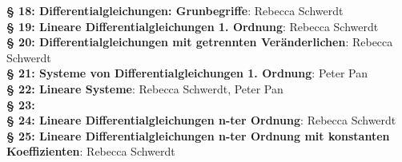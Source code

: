\documentclass[a4paper,twoside,DIV15,BCOR12mm,chapterprefix=true,headings=twolinechapter]{scrbook}
\begin{document}
\textbf{§ 18: Differentialgleichungen: Grunbegriffe}: Rebecca Schwerdt\\
\textbf{§ 19: Lineare Differentialgleichungen 1. Ordnung}: Rebecca Schwerdt\\
\textbf{§ 20: Differentialgleichungen mit getrennten Veränderlichen}: Rebecca Schwerdt\\
\textbf{§ 21: Systeme von Differentialgleichungen 1. Ordnung}: Peter Pan\\
\textbf{§ 22: Lineare Systeme}: Rebecca Schwerdt, Peter Pan\\
\textbf{§ 23: }\\
\textbf{§ 24: Lineare Differentialgleichungen n-ter Ordnung}: Rebecca Schwerdt\\
\textbf{§ 25: Lineare Differentialgleichungen n-ter Ordnung mit konstanten Koeffizienten}: Rebecca Schwerdt\\
\end{document}
